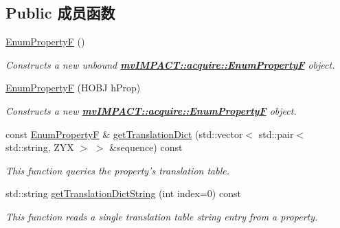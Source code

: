 \subsection*{Public 成员函数}
\begin{DoxyCompactItemize}
\item 
\hypertarget{classmv_i_m_p_a_c_t_1_1acquire_1_1_enum_property_f_a410b3f189ea1166fc2f0d1804d5b0bef}{\hyperlink{classmv_i_m_p_a_c_t_1_1acquire_1_1_enum_property_f_a410b3f189ea1166fc2f0d1804d5b0bef}{Enum\+Property\+F} ()}\label{classmv_i_m_p_a_c_t_1_1acquire_1_1_enum_property_f_a410b3f189ea1166fc2f0d1804d5b0bef}

\begin{DoxyCompactList}\small\item\em Constructs a new unbound {\bfseries \hyperlink{classmv_i_m_p_a_c_t_1_1acquire_1_1_enum_property_f}{mv\+I\+M\+P\+A\+C\+T\+::acquire\+::\+Enum\+Property\+F}} object. \end{DoxyCompactList}\item 
\hyperlink{classmv_i_m_p_a_c_t_1_1acquire_1_1_enum_property_f_a70c382683e15f9a02a253945a96a7367}{Enum\+Property\+F} (H\+O\+B\+J h\+Prop)
\begin{DoxyCompactList}\small\item\em Constructs a new {\bfseries \hyperlink{classmv_i_m_p_a_c_t_1_1acquire_1_1_enum_property_f}{mv\+I\+M\+P\+A\+C\+T\+::acquire\+::\+Enum\+Property\+F}} object. \end{DoxyCompactList}\item 
const \hyperlink{classmv_i_m_p_a_c_t_1_1acquire_1_1_enum_property_f}{Enum\+Property\+F} \& \hyperlink{classmv_i_m_p_a_c_t_1_1acquire_1_1_enum_property_f_abe9c44a152e4d643309647817e085479}{get\+Translation\+Dict} (std\+::vector$<$ std\+::pair$<$ std\+::string, Z\+Y\+X $>$ $>$ \&sequence) const 
\begin{DoxyCompactList}\small\item\em This function queries the property's translation table. \end{DoxyCompactList}\item 
std\+::string \hyperlink{classmv_i_m_p_a_c_t_1_1acquire_1_1_enum_property_f_a468d800a0a7063c06671b145f8db838d}{get\+Translation\+Dict\+String} (int index=0) const 
\begin{DoxyCompactList}\small\item\em This function reads a single translation table string entry from a property. \end{DoxyCompactList}\item 

\end{DoxyCompactItemize}
